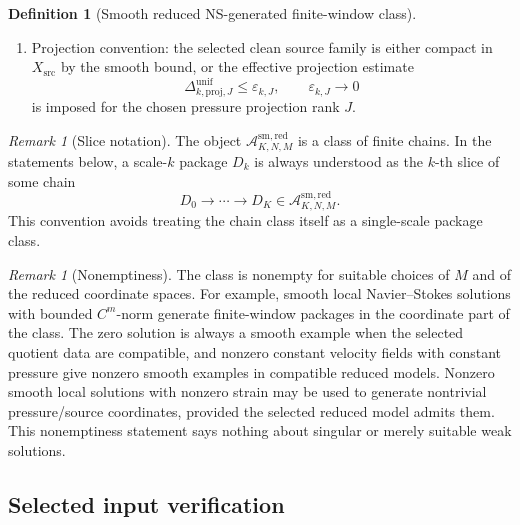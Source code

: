 \documentclass[11pt]{article}
\numberwithin{equation}{section}
\theoremstyle{plain}
\theoremstyle{definition}
\newtheorem{definition}[theorem]{Definition}
\theoremstyle{remark}
\newtheorem{remark}[theorem]{Remark}
\newcommand{\cl}{\mathrm{cl}}
\newcommand{\comp}{\mathrm{comp}}
\newcommand{\proj}{\mathrm{proj}}
\newcommand{\A}{\mathcal A}
\newcommand{\K}{\mathcal K}
\begin{document}
\begin{definition}[Smooth reduced NS-generated finite-window class]
\begin{enumerate}[label=(\alph*)]
  quotient section is compact, \(M_{\Lambda,k}^{\comp}\) is lower
  semicontinuous and positively homogeneous, and
  \[
    \K_{\Lambda,k}^{\cl}\subset\Gamma_{\Lambda,k}^{\cl}.
  \]
  In a reduced finite-dimensional detector model this may be checked by
  \[
    \ker \mathcal T_{\Lambda,k}^{\cl}=G_{\Lambda,k}^{\cl}
  \]
  for the clean detector/tax-channel matrix \(\mathcal T_{\Lambda,k}^{\cl}\).
  In the pressure--flux--energy realization below, this condition is replaced
  by the concrete matrix condition
  \[
    \ker T_{\Lambda,k}^{\mathrm{PFE}}=G_{\Lambda,k}^{\cl}.
  \]
  \item Projection convention: the selected clean source family is either
  compact in \(X_{\mathrm{src}}\) by the smooth bound, or the effective
  projection estimate
  \[
    \Delta_{k,\proj,J}^{\mathrm{unif}}\le \varepsilon_{k,J},
    \qquad
    \varepsilon_{k,J}\to0
  \]
  is imposed for the chosen pressure projection rank \(J\).
\end{enumerate}
\end{definition}

\begin{remark}[Slice notation]
The object \(\A_{K,N,M}^{\mathrm{sm,red}}\) is a class of finite chains.  In
the statements below, a scale-\(k\) package \(D_k\) is always understood as
the \(k\)-th slice of some chain
\[
  D_0\to\cdots\to D_K\in\A_{K,N,M}^{\mathrm{sm,red}}.
\]
This convention avoids treating the chain class itself as a single-scale
package class.
\end{remark}

\begin{remark}[Nonemptiness]
The class is nonempty for suitable choices of \(M\) and of the reduced
coordinate spaces.  For example, smooth local Navier--Stokes solutions with
bounded \(C^m\)-norm generate finite-window packages in the coordinate part of
the class.  The zero solution is always a smooth example when the selected
quotient data are compatible, and nonzero constant velocity fields with
constant pressure give nonzero smooth examples in compatible reduced models.
Nonzero smooth local solutions with nonzero strain may be used to generate
nontrivial pressure/source coordinates, provided the selected reduced model
admits them.
This nonemptiness statement says nothing about singular or merely suitable
weak solutions.
\end{remark}

\subsection{Selected input verification}
\end{document}
